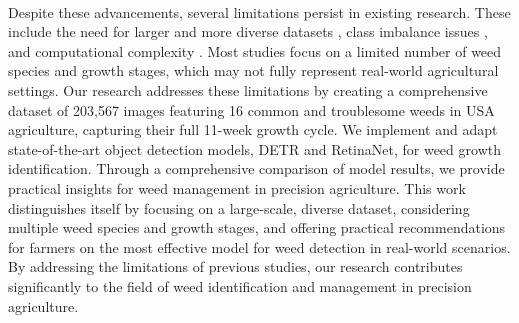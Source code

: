 \\
Despite these advancements, several limitations persist in existing research. These include the need for larger and more diverse datasets \cite{Gallo2023-zs} \cite{Asad2020-wj}, class imbalance issues \cite{Hasan2024-su}, and computational complexity \cite{Asad2023-zv}. Most studies focus on a limited number of weed species \cite{Moldvai2024-hb} \cite{Ahmad2021-gs} and growth stages, which may not fully represent real-world agricultural settings.
Our research addresses these limitations by creating a comprehensive dataset of 203,567 images featuring 16 common and troublesome weeds in USA agriculture, capturing their full 11-week growth cycle. We implement and adapt state-of-the-art object detection models, DETR and RetinaNet, for weed growth identification. Through a comprehensive comparison of model results, we provide practical insights for weed management in precision agriculture.
This work distinguishes itself by focusing on a large-scale, diverse dataset, considering multiple weed species and growth stages, and offering practical recommendations for farmers on the most effective model for weed detection in real-world scenarios. By addressing the limitations of previous studies, our research contributes significantly to the field of weed identification and management in precision agriculture.